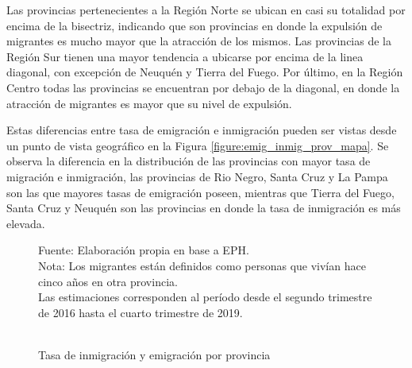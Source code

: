 \documentclass[12pt,a4paper]{article}
\begin{document}
Las provincias pertenecientes a la Región Norte se ubican en casi su totalidad por encima de la bisectriz, indicando que son provincias en donde la expulsión de migrantes es mucho mayor que la atracción de los mismos. Las provincias de la Región Sur tienen una mayor tendencia a ubicarse por encima de la linea diagonal, con excepción de Neuquén y Tierra del Fuego. Por último, en la Región Centro todas las provincias se encuentran por debajo de la diagonal, en donde la atracción de migrantes es mayor que su nivel de expulsión.

Estas diferencias entre tasa de emigración e inmigración pueden ser vistas desde un punto de vista geográfico en la Figura \ref{figure:emig_inmig_prov_mapa}. Se observa la diferencia en la distribución de las provincias con mayor tasa de migración e inmigración, las provincias de Rio Negro, Santa Cruz y La Pampa son las que mayores tasas de emigración poseen, mientras que Tierra del Fuego, Santa Cruz y Neuquén son  las provincias en donde la tasa de inmigración es más elevada.

\begin{figure}[htbp!]
\begin{center}
\caption{\\Tasa de inmigración y emigración por provincia}

\label{figure:emig_inmig_prov}
\end{center}
\begin{flushleft}
\begin{scriptsize}
Fuente: Elaboración propia en base a EPH.\\
Nota: Los migrantes están definidos como personas que vivían hace cinco años en otra provincia.\\
Las estimaciones corresponden al período desde el segundo trimestre de 2016 hasta el cuarto trimestre de 2019.\\
\end{scriptsize}
\end{flushleft}
\end{figure}
\end{document}
